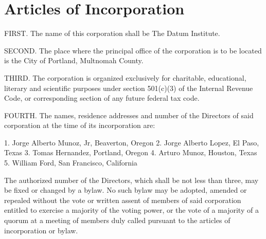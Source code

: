 \section{Articles of Incorporation}

FIRST. The name of this corporation shall be The Datum Institute.

SECOND. The place where the principal office of the corporation is to be located is the City of Portland, Multnomah County.

THIRD. The corporation is organized exclusively for charitable, educational, literary and scientific purposes under section 501(c)(3) of the Internal Revenue Code, or corresponding section of any future federal tax code. 

FOURTH. The names, residence addresses and number of the Directors of said corporation at the time of its incorporation are:

1. Jorge Alberto Munoz, Jr, Beaverton, Oregon
2. Jorge Alberto Lopez, El Paso, Texas
3. Tomas Hernandez, Portland, Oregon
4. Arturo Munoz, Houston, Texas
5. William Ford, San Francisco, California

The authorized number of the Directors, which shall be not less than three, may be fixed or changed by a bylaw.  No such bylaw may be adopted, amended or repealed without the vote or written assent of members of said corporation entitled to exercise a majority of the voting power, or the vote of a majority of a quorum at a meeting of members duly called pursuant to the articles of incorporation or bylaw.